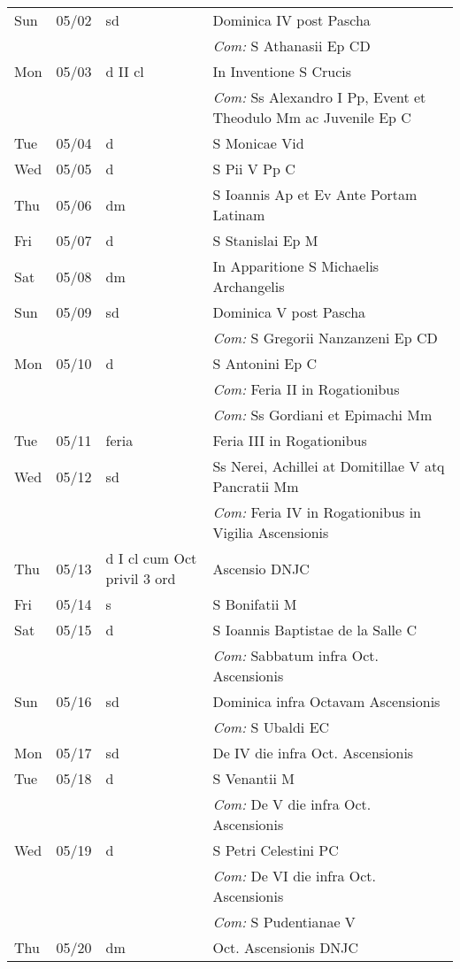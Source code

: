 \documentclass[10pt]{article}
\begin{document}
\begin{longtable}{ l l l l }
Sun & 05/02 & sd & Dominica IV post Pascha\\
 & & & \textit{Com:} S Athanasii Ep CD\\
Mon & 05/03 & d II cl & In Inventione S Crucis\\
 & & & \textit{Com:} Ss Alexandro I Pp, Event et Theodulo Mm ac Juvenile Ep C\\
Tue & 05/04 & d & S Monicae Vid\\
Wed & 05/05 & d & S Pii V Pp C\\
Thu & 05/06 & dm & S Ioannis Ap et Ev Ante Portam Latinam\\
Fri & 05/07 & d & S Stanislai Ep M\\
Sat & 05/08 & dm & In Apparitione S Michaelis Archangelis\\
Sun & 05/09 & sd & Dominica V post Pascha\\
 & & & \textit{Com:} S Gregorii Nanzanzeni Ep CD\\
Mon & 05/10 & d & S Antonini Ep C\\
 & & & \textit{Com:} Feria II in Rogationibus\\
 & & & \textit{Com:} Ss Gordiani et Epimachi Mm\\
Tue & 05/11 & feria & Feria III in Rogationibus\\
Wed & 05/12 & sd & Ss Nerei, Achillei at Domitillae V atq Pancratii Mm\\
 & & & \textit{Com:} Feria IV in Rogationibus in Vigilia Ascensionis \\
Thu & 05/13 & d I cl cum Oct privil 3 ord & Ascensio DNJC\\
Fri & 05/14 & s & S Bonifatii M\\
Sat & 05/15 & d & S Ioannis Baptistae de la Salle C\\
 & & & \textit{Com:} Sabbatum infra Oct. Ascensionis\\
Sun & 05/16 & sd & Dominica infra Octavam Ascensionis\\
 & & & \textit{Com:} S Ubaldi EC\\
Mon & 05/17 & sd & De IV die infra Oct. Ascensionis\\
Tue & 05/18 & d & S Venantii M\\
 & & & \textit{Com:} De V die infra Oct. Ascensionis\\
Wed & 05/19 & d & S Petri Celestini PC\\
 & & & \textit{Com:} De VI die infra Oct. Ascensionis\\
 & & & \textit{Com:} S Pudentianae V\\
Thu & 05/20 & dm & Oct. Ascensionis DNJC\\

\end{longtable}
\end{document}
